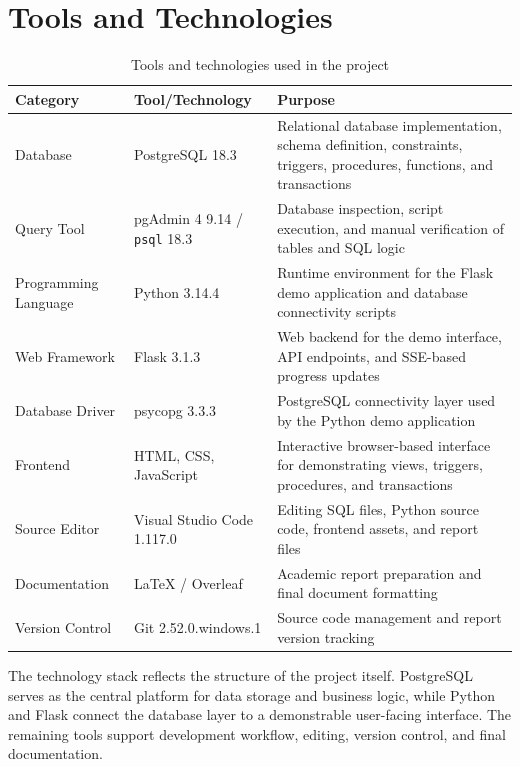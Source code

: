 \section{Tools and Technologies}
\begin{table}[H]
    \centering
    \small
    \caption{Tools and technologies used in the project}
    \label{tab:tools-technologies}
    \begin{tabular}{p{3.2cm}p{4.2cm}p{6.2cm}}
        \toprule
        \textbf{Category} & \textbf{Tool/Technology} & \textbf{Purpose} \\
        \midrule
        Database & PostgreSQL 18.3 & Relational database implementation, schema definition, constraints, triggers, procedures, functions, and transactions \\
        Query Tool & pgAdmin 4 9.14 / \texttt{psql} 18.3 & Database inspection, script execution, and manual verification of tables and SQL logic \\
        Programming Language & Python 3.14.4 & Runtime environment for the Flask demo application and database connectivity scripts \\
        Web Framework & Flask 3.1.3 & Web backend for the demo interface, API endpoints, and SSE-based progress updates \\
        Database Driver & psycopg 3.3.3 & PostgreSQL connectivity layer used by the Python demo application \\
        Frontend & HTML, CSS, JavaScript & Interactive browser-based interface for demonstrating views, triggers, procedures, and transactions \\
        Source Editor & Visual Studio Code 1.117.0 & Editing SQL files, Python source code, frontend assets, and report files \\
        Documentation & LaTeX / Overleaf & Academic report preparation and final document formatting \\
        Version Control & Git 2.52.0.windows.1 & Source code management and report version tracking \\
        \bottomrule
    \end{tabular}
\end{table}

The technology stack reflects the structure of the project itself. PostgreSQL serves as the central platform for data storage and business logic, while Python and Flask connect the database layer to a demonstrable user-facing interface. The remaining tools support development workflow, editing, version control, and final documentation.

